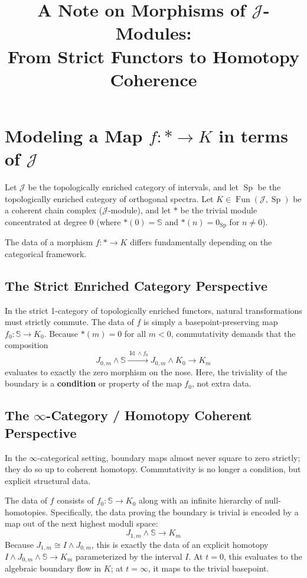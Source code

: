 \documentclass[11pt]{article}
\title{A Note on Morphisms of $\mathcal{J}$-Modules: \\ From Strict Functors to Homotopy Coherence}
\author{}
\date{}
\begin{document}
\maketitle

\section{Modeling a Map $f: * \to K$ in terms of $\mathcal{J}$}

Let $\mathcal{J}$ be the topologically enriched category of intervals, and let $\operatorname{Sp}$ be the topologically enriched category of orthogonal spectra. Let $K \in \operatorname{Fun}(\mathcal{J}, \operatorname{Sp})$ be a coherent chain complex ($\mathcal{J}$-module), and let $*$ be the trivial module concentrated at degree 0 (where $*(0) = \mathbb{S}$ and $*(n) = 0_{\operatorname{Sp}}$ for $n \neq 0$). 

The data of a morphism $f: * \to K$ differs fundamentally depending on the categorical framework.

\subsection{The Strict Enriched Category Perspective}
In the strict 1-category of topologically enriched functors, natural transformations must strictly commute. The data of $f$ is simply a basepoint-preserving map $f_0: \mathbb{S} \to K_0$. 
Because $*(m) = 0$ for all $m < 0$, commutativity demands that the composition 
\[ J_{0,m} \wedge \mathbb{S} \xrightarrow{\operatorname{Id} \wedge f_0} J_{0,m} \wedge K_0 \to K_m \]
evaluates to exactly the zero morphism on the nose. Here, the triviality of the boundary is a \textbf{condition} or property of the map $f_0$, not extra data.

\subsection{The $\infty$-Category / Homotopy Coherent Perspective}
In the $\infty$-categorical setting, boundary maps almost never square to zero strictly; they do so up to coherent homotopy. Commutativity is no longer a condition, but explicit structural data. 

The data of $f$ consists of $f_0: \mathbb{S} \to K_0$ along with an infinite hierarchy of null-homotopies. Specifically, the data proving the boundary is trivial is encoded by a map out of the next highest moduli space:
\[ J_{1,m} \wedge \mathbb{S} \to K_m \]
Because $J_{1,m} \cong I \wedge J_{0,m}$, this is exactly the data of an explicit homotopy $I \wedge J_{0,m} \wedge \mathbb{S} \to K_m$ parameterized by the interval $I$. At $t=0$, this evaluates to the algebraic boundary flow in $K$; at $t=\infty$, it maps to the trivial basepoint.
\end{document}
